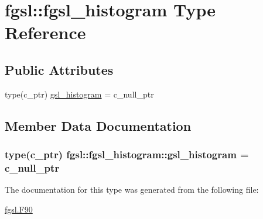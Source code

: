 \hypertarget{structfgsl_1_1fgsl__histogram}{\section{fgsl\-:\-:fgsl\-\_\-histogram Type Reference}
\label{structfgsl_1_1fgsl__histogram}
}
\subsection*{Public Attributes}
\begin{DoxyCompactItemize}
\item 
type(c\-\_\-ptr) \hyperlink{structfgsl_1_1fgsl__histogram_ab9424b661b6155c5425ee2276c228cab}{gsl\-\_\-histogram} = c\-\_\-null\-\_\-ptr
\end{DoxyCompactItemize}


\subsection{Member Data Documentation}
\hypertarget{structfgsl_1_1fgsl__histogram_ab9424b661b6155c5425ee2276c228cab}{
\subsubsection[{gsl\-\_\-histogram}]{\setlength{\rightskip}{0pt plus 5cm}type(c\-\_\-ptr) fgsl\-::fgsl\-\_\-histogram\-::gsl\-\_\-histogram = c\-\_\-null\-\_\-ptr}}\label{structfgsl_1_1fgsl__histogram_ab9424b661b6155c5425ee2276c228cab}


The documentation for this type was generated from the following file\-:\begin{DoxyCompactItemize}
\item 
\hyperlink{fgsl_8F90}{fgsl.\-F90}\end{DoxyCompactItemize}
